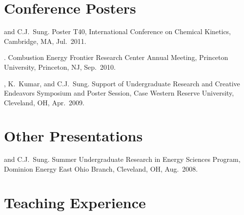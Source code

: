 \section{{\sectionfont Conference Posters}}

\begin{bibmune}
\item {} and C.J.\ Sung.  Poster T40,  International
        Conference on Chemical Kinetics, Cambridge, MA, Jul.\ 2011.\\

\item {}. 
         Combustion Energy Frontier Research Center
        Annual Meeting, Princeton University, Princeton, NJ,
        Sep.\ 2010.\\

\item {}, K.\ Kumar, and C.J.\ Sung.  Support of Undergraduate
        Research and Creative Endeavors Symposium and Poster Session,
        Case Western Reserve University, Cleveland, OH, Apr.\ 2009.\\
\end{bibmune}

\section{{\sectionfont Other Presentations}}

\begin{bibmune}
\item {} and C.J.\ Sung. 
        Summer Undergraduate Research in Energy Sciences Program,
        Dominion Energy East Ohio Branch, Cleveland, OH, Aug.\ 2008.
\end{bibmune}

\vspace{0.1in}

\section{{\sectionfont Teaching Experience}}

